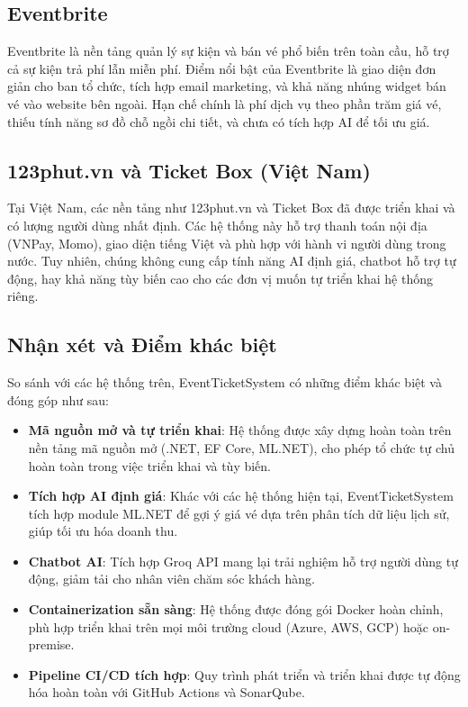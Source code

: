 \documentclass[../main.tex]{subfiles}
\begin{document}
\subsection{Eventbrite}

Eventbrite là nền tảng quản lý sự kiện và bán vé phổ biến trên toàn cầu, hỗ trợ cả sự kiện trả phí lẫn miễn phí. Điểm nổi bật của Eventbrite là giao diện đơn giản cho ban tổ chức, tích hợp email marketing, và khả năng nhúng widget bán vé vào website bên ngoài. Hạn chế chính là phí dịch vụ theo phần trăm giá vé, thiếu tính năng sơ đồ chỗ ngồi chi tiết, và chưa có tích hợp AI để tối ưu giá.

\subsection{123phut.vn và Ticket Box (Việt Nam)}

Tại Việt Nam, các nền tảng như 123phut.vn và Ticket Box đã được triển khai và có lượng người dùng nhất định. Các hệ thống này hỗ trợ thanh toán nội địa (VNPay, Momo), giao diện tiếng Việt và phù hợp với hành vi người dùng trong nước. Tuy nhiên, chúng không cung cấp tính năng AI định giá, chatbot hỗ trợ tự động, hay khả năng tùy biến cao cho các đơn vị muốn tự triển khai hệ thống riêng.

\subsection{Nhận xét và Điểm khác biệt}

So sánh với các hệ thống trên, EventTicketSystem có những điểm khác biệt và đóng góp như sau:

\begin{itemize}
    \item \textbf{Mã nguồn mở và tự triển khai}: Hệ thống được xây dựng hoàn toàn trên nền tảng mã nguồn mở (.NET, EF Core, ML.NET), cho phép tổ chức tự chủ hoàn toàn trong việc triển khai và tùy biến.
    \item \textbf{Tích hợp AI định giá}: Khác với các hệ thống hiện tại, EventTicketSystem tích hợp module ML.NET để gợi ý giá vé dựa trên phân tích dữ liệu lịch sử, giúp tối ưu hóa doanh thu.
    \item \textbf{Chatbot AI}: Tích hợp Groq API mang lại trải nghiệm hỗ trợ người dùng tự động, giảm tải cho nhân viên chăm sóc khách hàng.
    \item \textbf{Containerization sẵn sàng}: Hệ thống được đóng gói Docker hoàn chỉnh, phù hợp triển khai trên mọi môi trường cloud (Azure, AWS, GCP) hoặc on-premise.
    \item \textbf{Pipeline CI/CD tích hợp}: Quy trình phát triển và triển khai được tự động hóa hoàn toàn với GitHub Actions và SonarQube.
\end{itemize}
\end{document}
